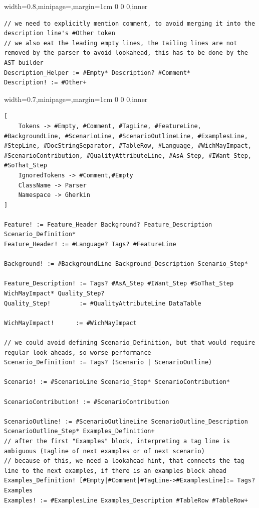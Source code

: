 \documentclass[dissertation,final]{softeng}
\newenvironment{featurecode}[1]
{ \lrbox\featurebox \begin{adjustbox}{width=#1\textwidth,minipage=\textwidth,margin=1cm 0 0 0,inner} }
{ \end{adjustbox}\endlrbox}
\newenvironment{featurelist}[2]
{
\newcommand{\setcaption}{\caption{#1}}
\newcommand{\setlabel}{\label{#2}}
}
{\begin{listing}[h!]\centering\usebox\featurebox\setcaption\setlabel\end{listing}}
\begin{document}
\begin{appendices}
\begin{featurelist}{Original gherkin grammar}{lst:original_gherkin_grammar}
\begin{featurecode}{0.8}
\begin{verbatim}
// we need to explicitly mention comment, to avoid merging it into the description line's #Other token
// we also eat the leading empty lines, the tailing lines are not removed by the parser to avoid lookahead, this has to be done by the AST builder
Description_Helper := #Empty* Description? #Comment*
Description! := #Other+
\end{verbatim}
\end{featurecode}
\end{featurelist}
\begin{featurelist}{Updated gherkin grammar}{lst:updated_gherkin_grammar}
\begin{featurecode}{0.7}
\begin{verbatim}
[
	Tokens -> #Empty, #Comment, #TagLine, #FeatureLine, #BackgroundLine, #ScenarioLine, #ScenarioOutlineLine, #ExamplesLine, #StepLine, #DocStringSeparator, #TableRow, #Language, #WichMayImpact, #ScenarioContribution, #QualityAttributeLine, #AsA_Step, #IWant_Step, #SoThat_Step 
	IgnoredTokens -> #Comment,#Empty
	ClassName -> Parser
	Namespace -> Gherkin
]

Feature! := Feature_Header Background? Feature_Description Scenario_Definition*
Feature_Header! := #Language? Tags? #FeatureLine

Background! := #BackgroundLine Background_Description Scenario_Step*

Feature_Description! := Tags? #AsA_Step #IWant_Step #SoThat_Step WichMayImpact* Quality_Step?
Quality_Step!        := #QualityAttributeLine DataTable

WichMayImpact!		:= #WichMayImpact

// we could avoid defining Scenario_Definition, but that would require regular look-aheads, so worse performance
Scenario_Definition! := Tags? (Scenario | ScenarioOutline)

Scenario! := #ScenarioLine Scenario_Step* ScenarioContribution*

ScenarioContribution! := #ScenarioContribution

ScenarioOutline! := #ScenarioOutlineLine ScenarioOutline_Description ScenarioOutline_Step* Examples_Definition+
// after the first "Examples" block, interpreting a tag line is ambiguous (tagline of next examples or of next scenario)
// because of this, we need a lookahead hint, that connects the tag line to the next examples, if there is an examples block ahead
Examples_Definition! [#Empty|#Comment|#TagLine->#ExamplesLine]:= Tags? Examples
Examples! := #ExamplesLine Examples_Description #TableRow #TableRow+


\end{verbatim}
\end{featurecode}
\end{featurelist}
\end{appendices}
\end{document}
